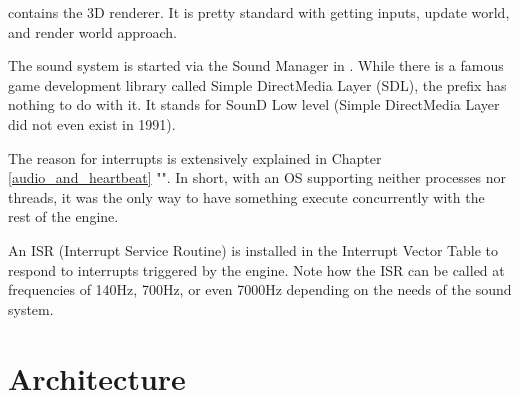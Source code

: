 \documentclass[book.tex]{subfiles}
\begin{document}
\begin{minipage}{\textwidth}

\end{minipage}
\par
{} contains the 3D renderer. It is pretty standard with getting inputs, update world, and render world approach.\\
\par
\begin{minipage}{\textwidth}

\end{minipage}
\par
The sound system is started via the Sound Manager in . While there is a famous game development library called Simple DirectMedia Layer (SDL), the prefix  has nothing to do with it. It stands for SounD Low level (Simple DirectMedia Layer did not even exist in 1991).\\
\par
The reason for interrupts is extensively explained in Chapter \ref{audio_and_heartbeat} "". In short, with an OS supporting neither processes nor threads, it was the only way to have something execute concurrently with the rest of the engine.\\
\par
An ISR (Interrupt Service Routine) is installed in the Interrupt Vector Table to respond to interrupts triggered by the engine. Note how the ISR can be called at frequencies of 140Hz, 700Hz, or even 7000Hz depending on the needs of the sound system.\\
\par
\vspace{20pt}
\begin{minipage}{\textwidth}

\end{minipage}
\par















\pagebreak
\section{Architecture}
\end{document}
